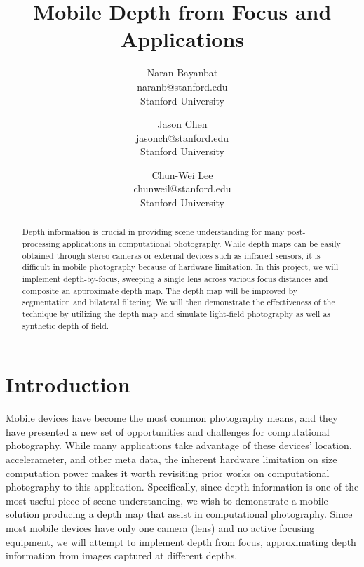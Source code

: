 \documentclass[annual, 12pt]{acmsiggraph}
\title{Mobile Depth from Focus and Applications}
\author{Naran Bayanbat\\naranb@stanford.edu\\Stanford University \and Jason Chen\\jasonch@stanford.edu\\Stanford University \and Chun-Wei Lee\\chunweil@stanford.edu\\Stanford University}
\begin{document}

\maketitle

\begin{abstract}
Depth information is crucial in providing scene understanding for many post-processing applications in computational photography. While depth maps can be easily obtained through stereo cameras or external devices such as infrared sensors, it is difficult in mobile photography because of hardware limitation. In this project, we will implement depth-by-focus, sweeping a single lens across various focus distances and composite an approximate depth map. The depth map will be improved by segmentation and bilateral filtering. We will then demonstrate the effectiveness of the technique by utilizing the depth map and simulate light-field photography as well as synthetic depth of field.

\end{abstract}

\begin{CRcatlist}
\end{CRcatlist}

\keywordlist


\copyrightspace

\section{Introduction}

Mobile devices have become the most common photography means, and they have presented a new set of opportunities and challenges for computational photography.  While many applications take advantage of these devices' location, accelerameter, and other meta data, the inherent hardware limitation on size computation power makes it worth revisiting prior works on computational photography to this application.  Specifically, since depth information is one of the most useful piece of scene understanding, we wish to demonstrate a mobile solution producing a depth map that assist in computational photography.  Since most mobile devices have only one camera (lens) and no active focusing equipment, we will attempt to implement depth from focus, approximating depth information from images captured at different depths. 
\end{document}
